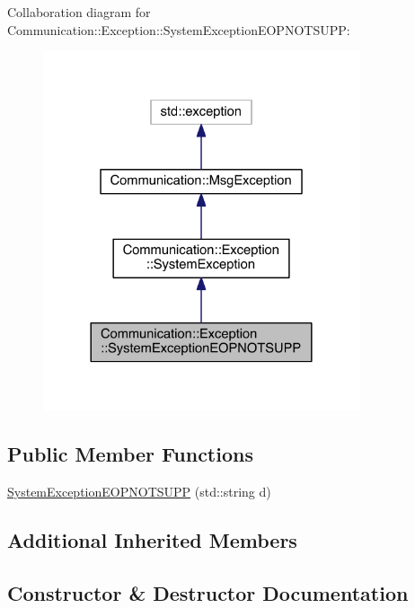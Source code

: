 Collaboration diagram for Communication\+:\+:Exception\+:\+:System\+Exception\+E\+O\+P\+N\+O\+T\+S\+U\+P\+P\+:\nopagebreak
\begin{figure}[H]
\begin{center}
\leavevmode
\includegraphics[width=264pt]{class_communication_1_1_exception_1_1_system_exception_e_o_p_n_o_t_s_u_p_p__coll__graph}
\end{center}
\end{figure}
\subsection*{Public Member Functions}
\begin{DoxyCompactItemize}
\item 
\hyperlink{class_communication_1_1_exception_1_1_system_exception_e_o_p_n_o_t_s_u_p_p_ac1c81408e9317e7054544d3f8f79fae3}{System\+Exception\+E\+O\+P\+N\+O\+T\+S\+U\+P\+P} (std\+::string d)
\end{DoxyCompactItemize}
\subsection*{Additional Inherited Members}


\subsection{Constructor \& Destructor Documentation}
\hypertarget{class_communication_1_1_exception_1_1_system_exception_e_o_p_n_o_t_s_u_p_p_ac1c81408e9317e7054544d3f8f79fae3}{}
